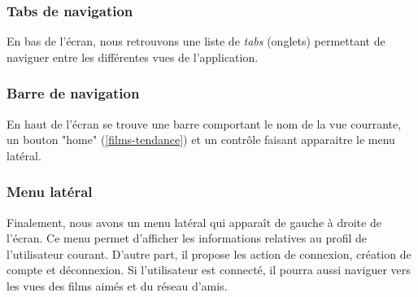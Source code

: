 \subsubsection{Tabs de navigation}
En bas de l'écran, nous retrouvons une liste de \textit{tabs} (onglets) permettant de naviguer entre les différentes vues de l'application.


\subsubsection{Barre de navigation}
En haut de l'écran se trouve une barre comportant le nom de la vue courrante, un bouton "home" (\ref{films-tendance}) et un contrôle faisant apparaitre le menu latéral.


\subsubsection{Menu latéral}
Finalement, nous avons un menu latéral qui apparaît de gauche à droite de l'écran. Ce menu permet d'afficher les informations relatives au profil de l'utilisateur courant. D'autre part, il propose les action de connexion, création de compte et déconnexion. Si l'utilisateur est connecté, il pourra aussi naviguer vers les vues des films aimés et du réseau d'amis.

